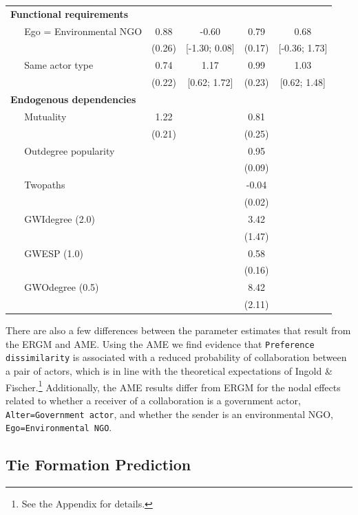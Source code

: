 \begin{table}[ht]
\begin{tabular}{lcccc}
  \textbf{Functional requirements} &  &  &  &  \\ 
  $\;\;\;\;$ Ego = Environmental NGO & 0.88 & -0.60 & 0.79 & 0.68 \\ 
   & (0.26) & [-1.30; 0.08] & (0.17) & [-0.36; 1.73] \\ 
  $\;\;\;\;$ Same actor type & 0.74 & 1.17 & 0.99 & 1.03 \\ 
   & (0.22) & [0.62; 1.72] & (0.23) & [0.62; 1.48] \\ 
  \textbf{Endogenous dependencies} &  &  &  &  \\ 
  $\;\;\;\;$ Mutuality & 1.22 &  & 0.81 &  \\ 
   & (0.21) &  & (0.25) &  \\ 
  $\;\;\;\;$ Outdegree popularity &  &  & 0.95 &  \\ 
   &  &  & (0.09) &  \\ 
  $\;\;\;\;$ Twopaths &  &  & -0.04 &  \\ 
   &  &  & (0.02) &  \\ 
  $\;\;\;\;$ GWIdegree (2.0) &  &  & 3.42 &  \\ 
   &  &  & (1.47) &  \\ 
  $\;\;\;\;$ GWESP (1.0) &  &  & 0.58 &  \\ 
   &  &  & (0.16) &  \\ 
  $\;\;\;\;$ GWOdegree (0.5) &  &  & 8.42 &  \\ 
   &  &  & (2.11) &  \\ 
   \hline\hline
\end{tabular}
\label{tab:regTable}
\end{table}
\FloatBarrier

There are also a few differences between the parameter estimates that result from the ERGM and AME. Using the AME we find evidence that \texttt{Preference dissimilarity} is associated with a reduced probability of collaboration between a pair of actors, which is in line with the theoretical expectations of Ingold \& Fischer.\footnote{See the Appendix for details.} Additionally, the AME results differ from ERGM for the nodal effects related to whether a receiver of a collaboration is a government actor, \texttt{Alter=Government actor}, and whether the sender is an environmental NGO, \texttt{Ego=Environmental NGO}.

\subsection*{Tie Formation Prediction}

